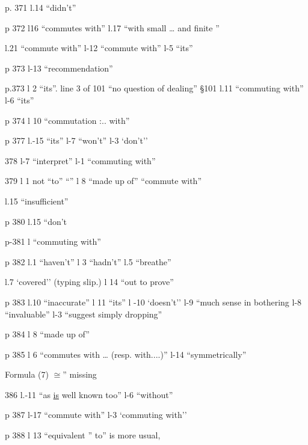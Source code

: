 
p. 371 l.14 ``didn't''

p 372 l16 ``commutes with'' \quad l.17 ``with small \ldots{} and finite ''

l.21 ``commute with'' \quad l-12 ``commute with'' \quad l-5 ``its''

p 373 l-13 ``recommendation''

p.373 l 2 ``its''. \quad line 3 of 101 ``no question of dealing'' \quad \S101 l.11 ``commuting with'' \quad l-6 ``its''

p 374 l 10 ``commutation :.. with''

p 377 l.-15 ``its'' \quad l-7 ``won't'' \quad l-3 `don't''

378 l-7 ``interpret'' \quad l-1 ``commuting with''

379 l 1 not ``to'' ``'' \quad l 8 ``made up of'' \quad ``commute with''

l.15 ``insufficient''

p 380 l.15 ``don't

p-381 l ``commuting with''

p 382 l.1 ``haven't'' \quad l 3 ``hadn't'' \quad l.5 ``breathe''

l.7 `covered'' (typing slip.) \quad l 14 ``out to prove''

p 383 l.10 ``inaccurate'' \quad l 11 ``its'' \quad l -10 `doesn't'' \quad l-9 ``much sense in bothering \quad l-8 ``invaluable'' \quad l-3 ``suggest simply dropping''

p 384 l 8 ``made up of''

p 385 l 6 ``commutes with \ldots{} (resp. with....)'' \quad l-14 ``symmetrically''

Formula (7) $\cong$'' missing

386 l.-11 ``as \uline{is} well known too'' \quad l-6 ``without''

p 387 l-17 ``commute with'' \quad l-3 `commuting with''

p 388 l 13 ``equivalent '' to'' is more usual,

